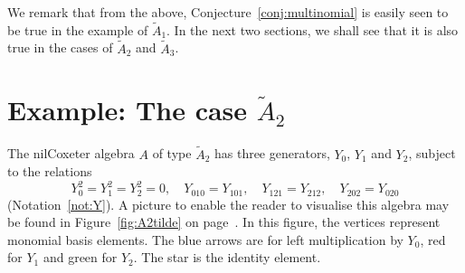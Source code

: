 \documentclass[12pt]{amsart}
\numberwithin{equation}{section}
\theoremstyle{definition}
\begin{document}
We remark that from the above, Conjecture~\ref{conj:multinomial} is easily seen to be true in the
example of $\tilde A_1$. In the next two sections, we shall see that
it is also true in the cases of $\tilde A_2$ and $\tilde A_3$.

\section{\texorpdfstring{Example: The case $\tilde A_2$}
{Example: The case Ã₂}}\label{se:A2tilde}


The nilCoxeter algebra $A$ of type $\tilde A_2$ has three generators,
$Y_0$, $Y_1$ and $Y_2$, subject to the relations
\[ Y_0^2=Y_1^2=Y_2^2=0,\quad Y_{010}=Y_{101},\quad
  Y_{121}=Y_{212},\quad Y_{202}=Y_{020} \]
(Notation~\ref{not:Y}). 
A picture to enable the reader to visualise 
this algebra may be found in Figure~\ref{fig:A2tilde} on
page~\pageref{fig:A2tilde}. In this figure, the vertices represent
monomial basis elements. The
blue arrows are for left multiplication by $Y_0$, red for $Y_1$
and green for $Y_2$. The star is the identity element. 
\end{document}
